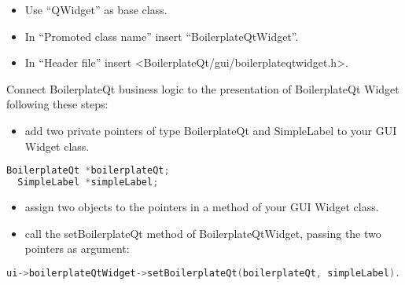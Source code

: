 \begin{itemize}
  \tightlist
  \item
        Use ``QWidget'' as base class.
\end{itemize}

\begin{itemize}
  \tightlist
  \item
        In ``Promoted class name'' insert ``BoilerplateQtWidget''.
\end{itemize}

\begin{itemize}
  \tightlist
  \item
        In ``Header file'' insert
        \textless BoilerplateQt/gui/boilerplateqtwidget.h\textgreater.
\end{itemize}

Connect BoilerplateQt business logic to the presentation of
BoilerplateQt Widget following these steps:

\begin{itemize}
  \tightlist
  \item
        add two private pointers of type BoilerplateQt and SimpleLabel to your
        GUI Widget class.
\end{itemize}

\begin{lstlisting}[language=c++, gobble=2]
  BoilerplateQt *boilerplateQt;
  SimpleLabel *simpleLabel;
\end{lstlisting}

\begin{itemize}
  \tightlist
  \item
        assign two objects to the pointers in a method of your GUI Widget
        class.
\end{itemize}

\begin{itemize}
  \tightlist
  \item
        call the setBoilerplateQt method of BoilerplateQtWidget, passing the
        two pointers as argument:
\end{itemize}

\begin{lstlisting}[language=c++, gobble=2]
  ui->boilerplateQtWidget->setBoilerplateQt(boilerplateQt, simpleLabel).
\end{lstlisting}
